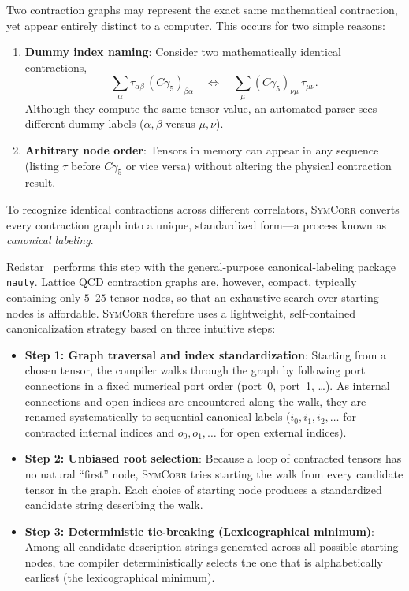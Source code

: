 \documentclass[a4paper,fleqn]{cas-dc}
\begin{document}
Two contraction graphs may represent the exact same mathematical contraction, yet appear entirely distinct to a computer. This occurs for two simple reasons:
\begin{enumerate}
    \item \textbf{Dummy index naming}: Consider two mathematically identical contractions,
    \begin{equation*}
    \sum_\alpha \tau_{\alpha\beta} \, (C\gamma_5)_{\beta\alpha} \quad \Longleftrightarrow \quad \sum_\mu (C\gamma_5)_{\nu\mu} \, \tau_{\mu\nu}.
    \end{equation*}
    Although they compute the same tensor value, an automated parser sees different dummy labels (\(\alpha,\beta\) versus \(\mu,\nu\)).
    \item \textbf{Arbitrary node order}: Tensors in memory can appear in any sequence (listing \(\tau\) before \(C\gamma_5\) or vice versa) without altering the physical contraction result.
\end{enumerate}

To recognize identical contractions across different correlators, \textsc{SymCorr} converts every contraction graph into a unique, standardized form---a process known as \emph{canonical labeling}.

Redstar~\cite{10.1145/3592979.3593409} performs this step with the general-purpose canonical-labeling package \texttt{nauty}. Lattice QCD contraction graphs are, however, compact, typically containing only $5$--$25$ tensor nodes, so that an exhaustive search over starting nodes is affordable. \textsc{SymCorr} therefore uses a lightweight, self-contained canonicalization strategy based on three intuitive steps:
\begin{itemize}
    \item \textbf{Step 1: Graph traversal and index standardization}: Starting from a chosen tensor, the compiler walks through the graph by following port connections in a fixed numerical port order (port~0, port~1, \ldots). As internal connections and open indices are encountered along the walk, they are renamed systematically to sequential canonical labels (\(i_0, i_1, i_2, \ldots\) for contracted internal indices and \(o_0, o_1, \ldots\) for open external indices).
    \item \textbf{Step 2: Unbiased root selection}: Because a loop of contracted tensors has no natural ``first'' node, \textsc{SymCorr} tries starting the walk from every candidate tensor in the graph. Each choice of starting node produces a standardized candidate string describing the walk.
    \item \textbf{Step 3: Deterministic tie-breaking (Lexicographical minimum)}: Among all candidate description strings generated across all possible starting nodes, the compiler deterministically selects the one that is alphabetically earliest (the lexicographical minimum).
\end{itemize}
\end{document}
